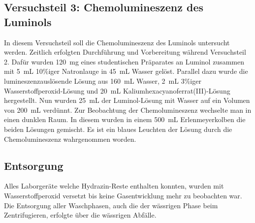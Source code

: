 \subsection*{Versuchsteil 3: Chemolumineszenz des Luminols}
In diesem Versuchsteil soll die Chemolumineszenz des Luminols untersucht werden. Zeitlich erfolgten Durchführung und Vorbereitung während Versuchsteil 2. Dafür wurden \SI{120}{\milli \gram} eines studentischen Präparates an Luminol zusammen mit \SI{5}{\milli \liter} 10\%iger Natronlauge in \SI{45}{\milli \liter} Wasser gelöst. Parallel dazu wurde die lumineszenzauslösende Lösung aus \SI{160}{\milli \liter} Wasser, \SI{2}{\milli \liter} 3\%iger Wasserstoffperoxid-Lösung und \SI{20}{\milli \liter} Kaliumhexacyanoferrat(III)-Lösung hergestellt.
Nun wurden \SI{25}{\milli \liter} der Luminol-Lösung mit Wasser auf ein Volumen von \SI{200}{\milli \liter} verdünnt.
\newpage
Zur Beobachtung der Chemolumineszenz wechselte man in einen dunklen Raum. In diesem wurden in einem \SI{500}{\milli \liter} Erlenmeyerkolben die beiden Lösungen gemischt. Es ist ein blaues Leuchten der Lösung durch die Chemolumineszenz wahrgenommen worden.

\subsection*{Entsorgung}
Alles Laborgeräte welche Hydrazin-Reste enthalten konnten, wurden mit Wasserstoffperoxid versetzt bis keine Gasentwicklung mehr zu beobachten war. Die Entsorgung aller Waschphasen, auch die der wässrigen Phase beim Zentrifugieren, erfolgte über die wässrigen Abfälle.